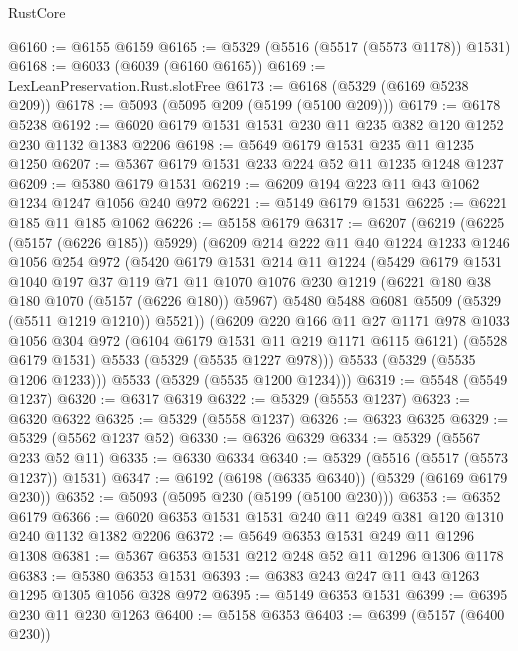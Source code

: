 \begin{lexlean}{RustCore}
\begin{coremodule}
@6160 := @6155 @6159
@6165 := @5329 (@5516 (@5517 (@5573 @1178)) @1531)
@6168 := @6033 (@6039 (@6160 @6165))
@6169 := LexLeanPreservation.Rust.slotFree
@6173 := @6168 (@5329 (@6169 @5238 @209))
@6178 := @5093 (@5095 @209 (@5199 (@5100 @209)))
@6179 := @6178 @5238
@6192 := @6020 @6179 @1531 @1531 @230 @11 @235 @382 @120 @1252 @230 @1132 @1383 @2206
@6198 := @5649 @6179 @1531 @235 @11 @1235 @1250
@6207 := @5367 @6179 @1531 @233 @224 @52 @11 @1235 @1248 @1237
@6209 := @5380 @6179 @1531
@6219 := @6209 @194 @223 @11 @43 @1062 @1234 @1247 @1056 @240 @972
@6221 := @5149 @6179 @1531
@6225 := @6221 @185 @11 @185 @1062
@6226 := @5158 @6179
@6317 := @6207
    (@6219
      (@6225 (@5157 (@6226 @185)) @5929)
      (@6209
        @214
        @222
        @11
        @40
        @1224
        @1233
        @1246
        @1056
        @254
        @972
        (@5420
          @6179
          @1531
          @214
          @11
          @1224
          (@5429
            @6179
            @1531
            @1040
            @197
            @37
            @119
            @71
            @11
            @1070
            @1076
            @230
            @1219
            (@6221 @180 @38 @180 @1070 (@5157 (@6226 @180)) @5967)
            @5480
            @5488
            @6081
            @5509
            (@5329 (@5511 @1219 @1210))
            @5521))
        (@6209
          @220
          @166
          @11
          @27
          @1171
          @978
          @1033
          @1056
          @304
          @972
          (@6104 @6179 @1531 @11 @219 @1171 @6115 @6121)
          (@5528 @6179 @1531)
          @5533
          (@5329 (@5535 @1227 @978)))
        @5533
        (@5329 (@5535 @1206 @1233)))
      @5533
      (@5329 (@5535 @1200 @1234)))
@6319 := @5548 (@5549 @1237)
@6320 := @6317 @6319
@6322 := @5329 (@5553 @1237)
@6323 := @6320 @6322
@6325 := @5329 (@5558 @1237)
@6326 := @6323 @6325
@6329 := @5329 (@5562 @1237 @52)
@6330 := @6326 @6329
@6334 := @5329 (@5567 @233 @52 @11)
@6335 := @6330 @6334
@6340 := @5329 (@5516 (@5517 (@5573 @1237)) @1531)
@6347 := @6192 (@6198 (@6335 @6340)) (@5329 (@6169 @6179 @230))
@6352 := @5093 (@5095 @230 (@5199 (@5100 @230)))
@6353 := @6352 @6179
@6366 := @6020 @6353 @1531 @1531 @240 @11 @249 @381 @120 @1310 @240 @1132 @1382 @2206
@6372 := @5649 @6353 @1531 @249 @11 @1296 @1308
@6381 := @5367 @6353 @1531 @212 @248 @52 @11 @1296 @1306 @1178
@6383 := @5380 @6353 @1531
@6393 := @6383 @243 @247 @11 @43 @1263 @1295 @1305 @1056 @328 @972
@6395 := @5149 @6353 @1531
@6399 := @6395 @230 @11 @230 @1263
@6400 := @5158 @6353
@6403 := @6399 (@5157 (@6400 @230))

\end{coremodule}
\end{lexlean}
